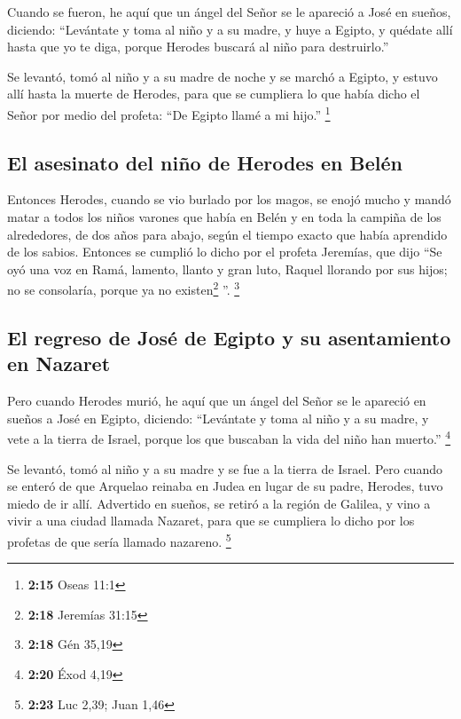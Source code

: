  Cuando se fueron, he aquí que un ángel del Señor se le
apareció a José en sueños, diciendo: ``Levántate y toma al niño y a su
madre, y huye a Egipto, y quédate allí hasta que yo te diga, porque
Herodes buscará al niño para destruirlo.''

 Se levantó, tomó al niño y a su madre de noche y se
marchó a Egipto,  y estuvo allí hasta la muerte de
Herodes, para que se cumpliera lo que había dicho el Señor por medio del
profeta: ``De Egipto llamé a mi hijo.'' \footnote{\textbf{2:15} Oseas
  11:1}

\hypertarget{el-asesinato-del-niuxf1o-de-herodes-en-beluxe9n}{%
\subsection{El asesinato del niño de Herodes en
Belén}\label{el-asesinato-del-niuxf1o-de-herodes-en-beluxe9n}}

 Entonces Herodes, cuando se vio burlado por los magos,
se enojó mucho y mandó matar a todos los niños varones que había en
Belén y en toda la campiña de los alrededores, de dos años para abajo,
según el tiempo exacto que había aprendido de los sabios.
 Entonces se cumplió lo dicho por el profeta Jeremías,
que dijo  ``Se oyó una voz en Ramá, lamento, llanto y
gran luto, Raquel llorando por sus hijos; no se consolaría, porque ya no
existen\footnote{\textbf{2:18} Jeremías 31:15} ''. \footnote{\textbf{2:18}
  Gén 35,19}

\hypertarget{el-regreso-de-josuxe9-de-egipto-y-su-asentamiento-en-nazaret}{%
\subsection{El regreso de José de Egipto y su asentamiento en
Nazaret}\label{el-regreso-de-josuxe9-de-egipto-y-su-asentamiento-en-nazaret}}

 Pero cuando Herodes murió, he aquí que un ángel del
Señor se le apareció en sueños a José en Egipto, diciendo:
 ``Levántate y toma al niño y a su madre, y vete a la
tierra de Israel, porque los que buscaban la vida del niño han muerto.''
\footnote{\textbf{2:20} Éxod 4,19}

 Se levantó, tomó al niño y a su madre y se fue a la
tierra de Israel.  Pero cuando se enteró de que Arquelao
reinaba en Judea en lugar de su padre, Herodes, tuvo miedo de ir allí.
Advertido en sueños, se retiró a la región de Galilea,  y
vino a vivir a una ciudad llamada Nazaret, para que se cumpliera lo
dicho por los profetas de que sería llamado nazareno. \footnote{\textbf{2:23}
  Luc 2,39; Juan 1,46}

